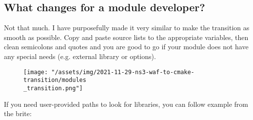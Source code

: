 \documentclass{article}
\begin{document}
\subsection*{What changes for a module developer?}
    Not that much. I have purposefully made it very similar to make the transition as smooth as possible.
    Copy and paste source lists to the appropriate variables, then clean semicolons and quotes and you are good to go
    if your module does not have any special needs (e.g. external library or options).

    \begin{figure}
        \texttt{[image: "/assets/img/2021-11-29-ns3-waf-to-cmake-transition/modules\\\_transition.png"]}
    \end{figure}

    If you need user-provided paths to look for libraries, you can follow example from the brite:
\end{document}
